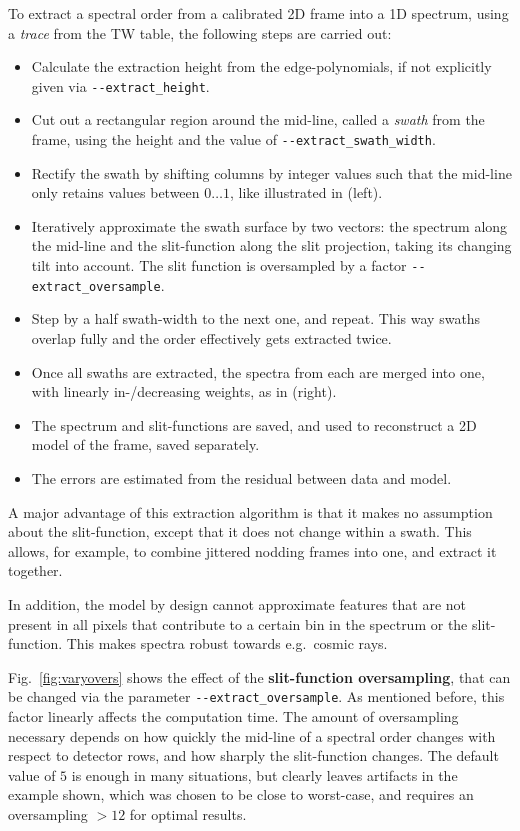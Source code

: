 To extract a spectral order from a calibrated 2D frame into a 1D spectrum, using
a \emph{trace} from the TW table, the following steps are carried out:
\begin{itemize}
    \item Calculate the extraction height from the edge-polynomials, if not
    explicitly given via \texttt{-{}-extract\_height}.
    \item Cut out a rectangular region around the mid-line, called a
    \emph{swath} from the frame, using the height and the value of
    \texttt{-{}-extract\_swath\_width}.
    \item Rectify the swath by shifting columns by integer values such that the
    mid-line only retains values between $0\ldots 1$, like illustrated in
     (left).
    \item Iteratively approximate the swath surface by two vectors: the spectrum
    along the mid-line and the slit-function along the slit projection, taking
    its changing tilt into account. The slit function is oversampled by a factor
    \verb!--extract_oversample!.
    \item Step by a half swath-width to the next one, and repeat. This way
    swaths overlap fully and the order effectively gets extracted twice.
    \item Once all swaths are extracted, the spectra from each are merged into
    one, with linearly in-/decreasing weights, as in 
    (right).
    \item The spectrum and slit-functions are saved, and used to reconstruct a
    2D model of the frame, saved separately.
    \item The errors are estimated from the residual between data and model.
\end{itemize}

A major advantage of this extraction algorithm is that it makes no assumption
about the slit-function, except that it does not change within a swath. This
allows, for example, to combine jittered nodding frames into one, and extract it
together.

In addition, the model by design cannot approximate features that are not
present in all pixels that contribute to a certain bin in the spectrum or the
slit-function. This makes spectra robust towards e.g.~cosmic rays.

Fig.~\ref{fig:varyovers} shows the effect of the \textbf{slit-function
oversampling}, that can be changed via  the parameter
\verb!--extract_oversample!. As mentioned before, this factor linearly affects
the computation time. The amount of oversampling necessary depends on how
quickly the mid-line of a spectral order changes with respect to detector rows,
and how sharply the slit-function changes. The default value of $5$ is enough in
many situations, but clearly leaves artifacts in the example shown, which was
chosen to be close to worst-case, and requires an oversampling $>12$ for optimal
results.

